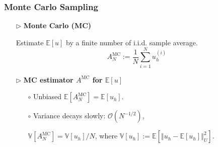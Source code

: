 \documentclass{beamer}
\begin{document}
\begin{frame}[t]
\frametitle{Monte Carlo Sampling}

\begin{itemize}[leftmargin=5pt] 
    \item[$\triangleright$] \textcolor{myblue3}{\bf Monte Carlo (MC)}
    
    {\small
    Estimate $\mathbb{E}[u]$ by  a finite number of i.i.d. sample average.
        \[
    A^{\text{MC}}_N:= \frac {1}{N}\sum_{i=1}^N u_h^{(i)}
    \]
     }       
    \item[$\triangleright$] \textcolor{myblue3}{\bf MC estimator $A^{\text{MC}}$ for $\mathbb{E}[u]$}
    {\small 
    \begin{itemize}[leftmargin=15pt] 
    \item[$\circ$] Unbiased $\mathbb{E}[A^{\text{MC}}_N] = \mathbb{E}[u_h]$.
    \item[$\circ$] Variance decays slowly: $\mathcal{O}(N^{-1/2})$,
    
    $\mathbb{V}[A^{\text{MC}}_N]= \mathbb{V}[u_h]/N$, where $\mathbb{V}[u_h] := \mathbb{E}[\left\Vert u_h - \mathbb{E}[u_h]\right\Vert_U^2]$.
    \end{itemize}
    }
    
    
    
            
\end{itemize}

\end{frame}
\end{document}
